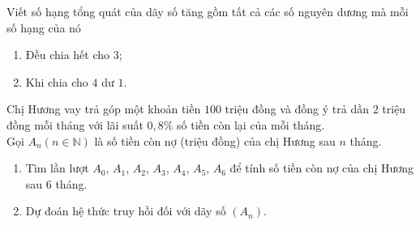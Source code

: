 \begin{bt}%
	Viết số hạng tổng quát của dãy số tăng gồm tất cả các số nguyên dương mà mỗi số hạng của nó
	\begin{enumerate}
		\item Đều chia hết cho $3$;
		\item Khi chia cho $4$ dư $1$.
	\end{enumerate}
\end{bt}

\begin{bt}%
	Chị Hương vay trả góp một khoản tiền $100$ triệu đồng và đồng ý trả dần $2$ triệu đồng mỗi tháng với lãi suất $0,8 \%$ số tiền còn lại của mỗi tháng.\\
	Gọi $A_n(n \in \mathbb{N})$ là số tiền còn nợ (triệu đồng) của chị Hương sau $n$ tháng.
	\begin{enumerate}
		\item Tìm lần lượt $A_0$, $A_1$, $A_2$, $A_3$, $A_4$, $A_5$, $A_6$ để tính số tiền còn nợ của chị Hương sau $6$ tháng.
		\item Dự đoán hệ thức truy hồi đối với dãy số $\left(A_n\right)$.
	\end{enumerate} 
\end{bt}

